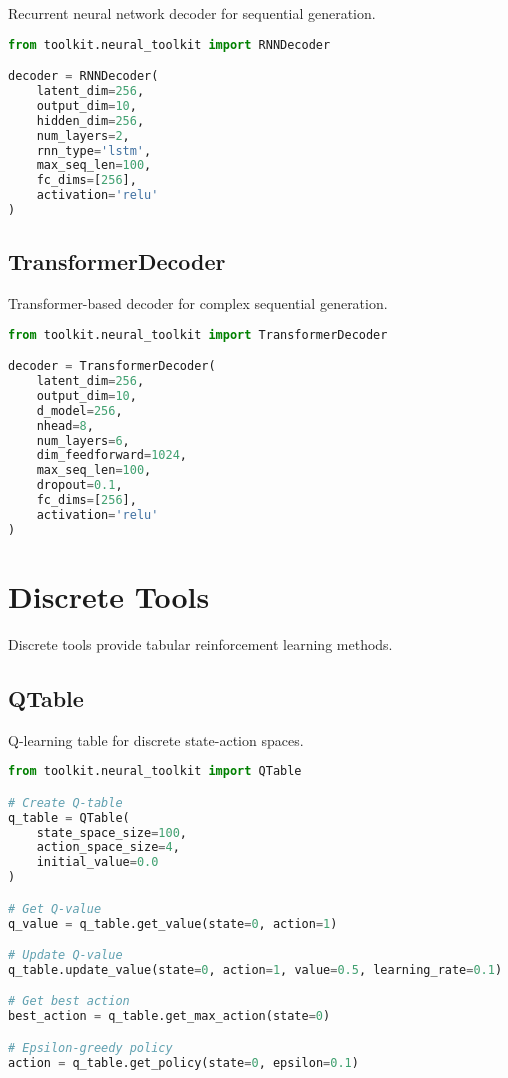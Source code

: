 Recurrent neural network decoder for sequential generation.

\begin{lstlisting}[language=python, caption=RNN Decoder]
from toolkit.neural_toolkit import RNNDecoder

decoder = RNNDecoder(
    latent_dim=256,
    output_dim=10,
    hidden_dim=256,
    num_layers=2,
    rnn_type='lstm',
    max_seq_len=100,
    fc_dims=[256],
    activation='relu'
)
\end{lstlisting}

\subsection{TransformerDecoder}

Transformer-based decoder for complex sequential generation.

\begin{lstlisting}[language=python, caption=Transformer Decoder]
from toolkit.neural_toolkit import TransformerDecoder

decoder = TransformerDecoder(
    latent_dim=256,
    output_dim=10,
    d_model=256,
    nhead=8,
    num_layers=6,
    dim_feedforward=1024,
    max_seq_len=100,
    dropout=0.1,
    fc_dims=[256],
    activation='relu'
)
\end{lstlisting}

\section{Discrete Tools}

Discrete tools provide tabular reinforcement learning methods.

\subsection{QTable}

Q-learning table for discrete state-action spaces.

\begin{lstlisting}[language=python, caption=Q-Table Usage]
from toolkit.neural_toolkit import QTable

# Create Q-table
q_table = QTable(
    state_space_size=100,
    action_space_size=4,
    initial_value=0.0
)

# Get Q-value
q_value = q_table.get_value(state=0, action=1)

# Update Q-value
q_table.update_value(state=0, action=1, value=0.5, learning_rate=0.1)

# Get best action
best_action = q_table.get_max_action(state=0)

# Epsilon-greedy policy
action = q_table.get_policy(state=0, epsilon=0.1)
\end{lstlisting}

